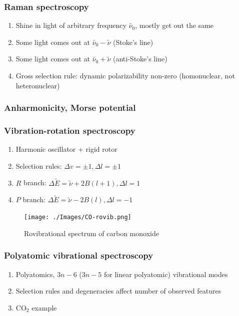 \documentclass[11pt]{article}
\begin{document}
\subsubsection{Raman spectroscopy}
\label{sec:orgff192e2}
\begin{enumerate}
\item Shine in light of arbitrary frequency \(\tilde{\nu_0}\), mostly get out the same
\item Some light comes out at \(\tilde{\nu_0}-\tilde{\nu}\) (Stoke's line)
\item Some light comes out at \(\tilde{\nu_0}+\tilde{\nu}\) (anti-Stoke's line)
\item Gross selection rule: dynamic polarizability non-zero (homonuclear, not heteronuclear)
\end{enumerate}
\subsubsection{Anharmonicity, Morse potential}
\label{sec:orgcb2e9ee}
\subsubsection{Vibration-rotation spectroscopy}
\label{sec:org138f42d}
\begin{enumerate}
\item Harmonic oscillator + rigid rotor
\item Selection rules: \(\Delta v = \pm 1, \Delta l=\pm 1\)
\item \(R\) branch: \(\Delta \tilde E  = \tilde \nu + 2B(l+1), \Delta l = 1\)
\item \(P\) branch: \(\Delta \tilde E = \tilde \nu - 2B(l), \Delta l = -1\)
\end{enumerate}
\begin{figure}[htbp]
\centering
\texttt{[image: ./Images/CO-rovib.png]}
\caption{Rovibrational spectrum of carbon monoxide}
\end{figure}
\subsubsection{Polyatomic vibrational spectroscopy}
\label{sec:orgae0da39}
\begin{enumerate}
\item Polyatomics, \(3n-6\) (\(3n-5\) for linear polyatomic) vibrational modes
\item Selection rules and degeneracies affect number of observed features
\item CO\(_2\) example
\end{enumerate}
\end{document}
